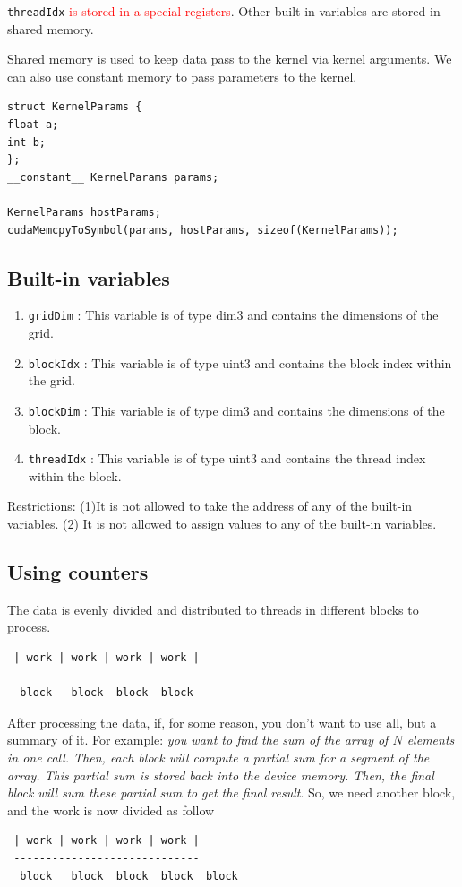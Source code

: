 \verb!threadIdx! \textcolor{red}{is stored in a special registers}.
Other built-in variables are stored in shared memory. 

Shared memory is used to keep data pass to the kernel via kernel
arguments. We can also use constant memory to pass parameters to the
kernel. 
\begin{lstlisting}
struct KernelParams {
float a;
int b;
};
__constant__ KernelParams params;

KernelParams hostParams;
cudaMemcpyToSymbol(params, hostParams, sizeof(KernelParams));
\end{lstlisting}

\subsection{Built-in variables}
\label{sec:built-variables}

\begin{enumerate}
\item \verb!gridDim!  : This variable is of type dim3 and contains the
  dimensions of the grid.
\item \verb!blockIdx! : This variable is of type uint3 and contains
  the block index within the grid.
\item \verb!blockDim!  : This variable is of type dim3 and contains
  the dimensions of the block.
\item \verb!threadIdx!  : This variable is of type uint3 and contains
  the thread index within the block.
\end{enumerate}
Restrictions: (1)It is not allowed to take the address of any of the
built-in variables.  (2) It is not allowed to assign values to any of
the built-in variables.


\subsection{Using counters}
\label{sec:using-counters}

The data is evenly divided and distributed to threads in different
blocks to process. 
\begin{verbatim}
 | work | work | work | work |
 -----------------------------
  block   block  block  block
\end{verbatim}

After processing the data, if, for some reason, you don't want to use
all, but a summary of it. For example:
{\it you want to find the sum of the array of $N$ elements in one
  call. Then, each block will compute a partial sum for a segment of
  the array. This partial sum is stored back into the device
  memory. Then, the final block will sum these partial sum to get the
  final result}.
So, we need another block, and the work is now divided as follow
\begin{verbatim}
 | work | work | work | work |
 -----------------------------
  block   block  block  block  block
\end{verbatim}

